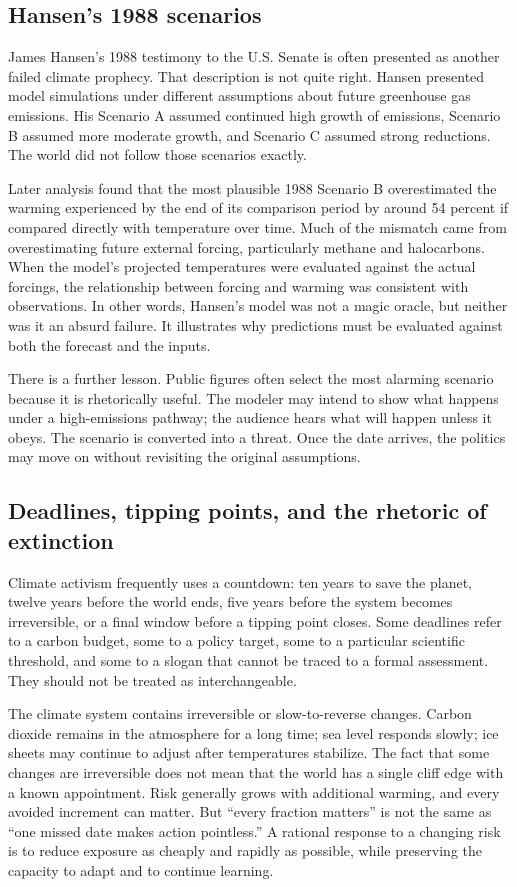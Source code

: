 ﻿\documentclass[12pt,a4paper]{book}
\begin{document}
\subsection{Hansen's 1988 scenarios}
James Hansen's 1988 testimony to the U.S. Senate is often presented as another failed climate prophecy. That description is not quite right. Hansen presented model simulations under different assumptions about future greenhouse gas emissions. His Scenario A assumed continued high growth of emissions, Scenario B assumed more moderate growth, and Scenario C assumed strong reductions. The world did not follow those scenarios exactly.

Later analysis found that the most plausible 1988 Scenario B overestimated the warming experienced by the end of its comparison period by around 54 percent if compared directly with temperature over time. Much of the mismatch came from overestimating future external forcing, particularly methane and halocarbons. When the model's projected temperatures were evaluated against the actual forcings, the relationship between forcing and warming was consistent with observations. In other words, Hansen's model was not a magic oracle, but neither was it an absurd failure. It illustrates why predictions must be evaluated against both the forecast and the inputs. \cite{Hausfather2020}

There is a further lesson. Public figures often select the most alarming scenario because it is rhetorically useful. The modeler may intend to show what happens under a high-emissions pathway; the audience hears what will happen unless it obeys. The scenario is converted into a threat. Once the date arrives, the politics may move on without revisiting the original assumptions.

\subsection{Deadlines, tipping points, and the rhetoric of extinction}
Climate activism frequently uses a countdown: ten years to save the planet, twelve years before the world ends, five years before the system becomes irreversible, or a final window before a tipping point closes. Some deadlines refer to a carbon budget, some to a policy target, some to a particular scientific threshold, and some to a slogan that cannot be traced to a formal assessment. They should not be treated as interchangeable.

The climate system contains irreversible or slow-to-reverse changes. Carbon dioxide remains in the atmosphere for a long time; sea level responds slowly; ice sheets may continue to adjust after temperatures stabilize. The fact that some changes are irreversible does not mean that the world has a single cliff edge with a known appointment. Risk generally grows with additional warming, and every avoided increment can matter. But ``every fraction matters'' is not the same as ``one missed date makes action pointless.'' A rational response to a changing risk is to reduce exposure as cheaply and rapidly as possible, while preserving the capacity to adapt and to continue learning.
\end{document}
